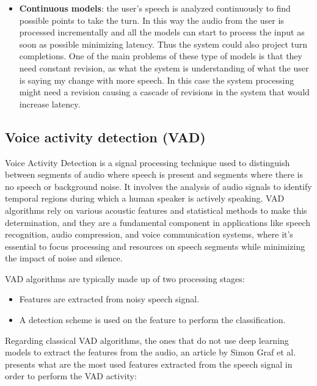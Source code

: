 \documentclass[../main.tex]{subfiles}
\begin{document}
\begin{itemize}
\item \textbf{Continuous models}: the user's speech is analyzed continuously to find possible points to take the turn. In this way the audio from the user is processed incrementally and all the models can start to process the input as soon as possible minimizing latency. Thus the system could also project turn completions. One of the main problems of these type of models is that they need constant revision, as what the system is understanding of what the user is saying my change with more speech. In this case the system processing might need a revision causing a cascade of revisions in the system that would increase latency.
\end{itemize}

\subsection{Voice activity detection (VAD)}
\label{voice activity detection}

Voice Activity Detection is a signal processing technique used to distinguish between segments of audio where speech is present and segments where there is no speech or background noise. It involves the analysis of audio signals to identify temporal regions during which a human speaker is actively speaking. VAD algorithms rely on various acoustic features and statistical methods to make this determination, and they are a fundamental component in applications like speech recognition, audio compression, and voice communication systems, where it's essential to focus processing and resources on speech segments while minimizing the impact of noise and silence.

VAD algorithms are typically made up of two processing stages: 

\begin{itemize}
    \item Features are extracted from noisy speech signal.
    \item A detection scheme is used on the feature to perform the classification.
\end{itemize}

Regarding classical VAD algorithms, the ones that do not use deep learning models to extract the features from the audio, an article by Simon Graf et al. \cite{graf2015features} presents what are the most used features extracted from the speech signal in order to perform the VAD activity:
\end{document}
